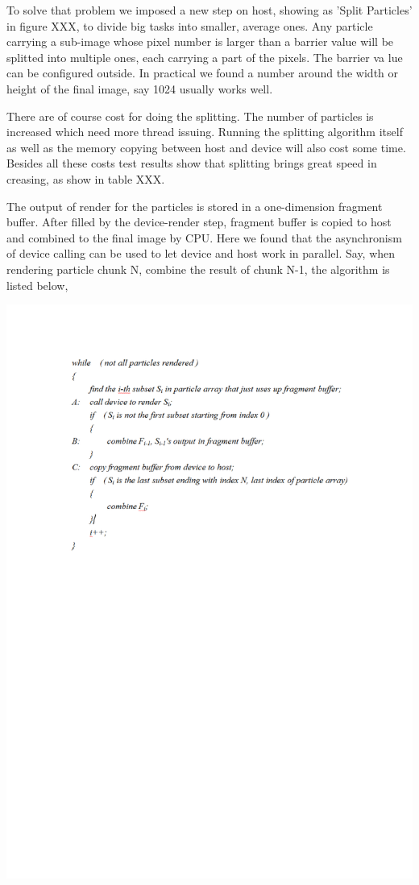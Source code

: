To solve that problem we imposed a new step on host, showing as 'Split Particles' 
in figure XXX, to divide big tasks into smaller, average ones. Any particle
carrying a sub-image whose pixel number is larger than a barrier value will be 
splitted into multiple ones, each carrying a part of the pixels. The barrier va
lue can be configured outside. In practical we found a number around the width 
or height of the final image, say 1024 usually works well.

There are of course cost for doing the splitting. The number of particles is 
increased which need more thread issuing. Running the splitting algorithm itself
as well as the memory copying between host and device will also cost some time. 
Besides all these costs test results show that splitting brings great speed in
creasing, as show in table XXX.

The output of render for the particles is stored in a one-dimension fragment buffer. 
After filled by the device-render step, fragment buffer is copied to host
 and combined to the final image by CPU. Here we found that the asynchronism of 
 device calling can be used to let device and host work in parallel. Say, when
rendering particle chunk N, combine the result of chunk N-1, the algorithm is listed below,

\includegraphics[width=1.2\textwidth]{cuda_code.pdf}


